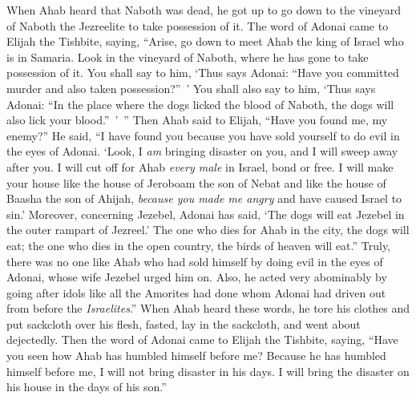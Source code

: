 \begin{biblechapter}
\verse When Ahab heard that Naboth was dead, he got up to go down to the vineyard of Naboth the Jezreelite to take possession of it.
 The word of Adonai came to Elijah the Tishbite, saying,
\verse “Arise, go down to meet Ahab the king of Israel who is in Samaria. Look in the vineyard of Naboth, where he has gone to take possession of it.
\verse You shall say to him, ‘Thus says Adonai: “Have you committed murder and also taken possession?” ’ You shall also say to him, ‘Thus says Adonai: “In the place where the dogs licked the blood of Naboth, the dogs will also lick your blood.” ’ ”
\verse Then Ahab said to Elijah, “Have you found me, my enemy?” He said, “I have found you because you have sold yourself to do evil in the eyes of Adonai.
\verse ‘Look, I \textit{am} bringing disaster on you, and I will sweep away after you. I will cut off for Ahab \textit{every male} in Israel, bond or free.
\verse I will make your house like the house of Jeroboam the son of Nebat and like the house of Baasha the son of Ahijah, \textit{because you made me angry} and have caused Israel to sin.’
\verse Moreover, concerning Jezebel, Adonai has said, ‘The dogs will eat Jezebel in the outer rampart of Jezreel.’
\verse The one who dies for Ahab in the city, the dogs will eat; the one who dies in the open country, the birds of heaven will eat.”
\verse Truly, there was no one like Ahab who had sold himself by doing evil in the eyes of Adonai, whose wife Jezebel urged him on.
\verse Also, he acted very abominably by going after idols like all the Amorites had done whom Adonai had driven out from before the \textit{Israelites}.”
\verse When Ahab heard these words, he tore his clothes and put sackcloth over his flesh, fasted, lay in the sackcloth, and went about dejectedly.
\verse Then the word of Adonai came to Elijah the Tishbite, saying,
\verse “Have you seen how Ahab has humbled himself before me? Because he has humbled himself before me, I will not bring disaster in his days. I will bring the disaster on his house in the days of his son.”
\end{biblechapter}

